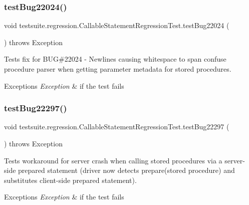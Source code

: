 \subsubsection{\texorpdfstring{test\+Bug22024()}{testBug22024()}}
{\footnotesize\ttfamily void testsuite.\+regression.\+Callable\+Statement\+Regression\+Test.\+test\+Bug22024 (\begin{DoxyParamCaption}{ }\end{DoxyParamCaption}) throws Exception}

Tests fix for B\+UG\#22024 -\/ Newlines causing whitespace to span confuse procedure parser when getting parameter metadata for stored procedures.


\begin{DoxyExceptions}{Exceptions}
{\em Exception} & if the test fails \\
\hline
\end{DoxyExceptions}
\mbox{\label{classtestsuite_1_1regression_1_1_callable_statement_regression_test_a601d825ec8a6e6d2a5e2d3141e9355b4}} 
\subsubsection{\texorpdfstring{test\+Bug22297()}{testBug22297()}}
{\footnotesize\ttfamily void testsuite.\+regression.\+Callable\+Statement\+Regression\+Test.\+test\+Bug22297 (\begin{DoxyParamCaption}{ }\end{DoxyParamCaption}) throws Exception}

Tests workaround for server crash when calling stored procedures via a server-\/side prepared statement (driver now detects prepare(stored procedure) and substitutes client-\/side prepared statement).


\begin{DoxyExceptions}{Exceptions}
{\em Exception} & if the test fails \\
\hline
\end{DoxyExceptions}
\mbox{\label{classtestsuite_1_1regression_1_1_callable_statement_regression_test_a8603b59f7d522506f151fce4db9e7fe7}} 
